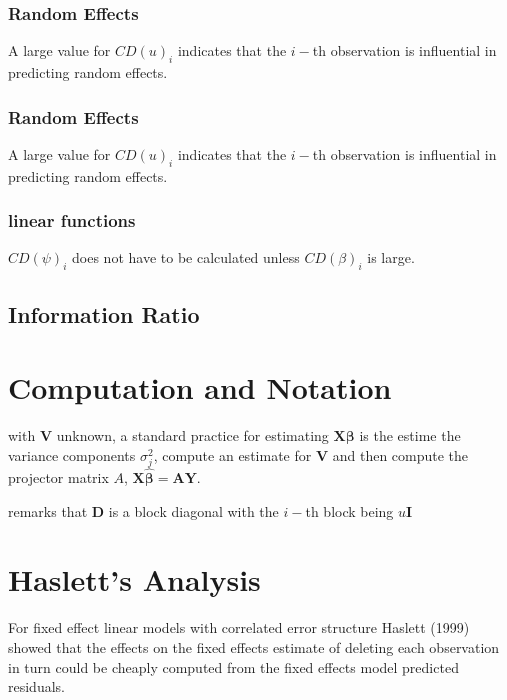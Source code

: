 \documentclass[12pt, a4paper]{article}
\begin{document}
\newpage
\subsubsection{Random Effects}


A large value for $CD(u)_i$ indicates that the $i-$th observation is influential in predicting random effects.


\subsubsection{Random Effects}


A large value for $CD(u)_i$ indicates that the $i-$th observation is influential in predicting random effects.


\subsubsection{linear functions}


$CD(\psi)_i$ does not have to be calculated unless $CD(\beta)_i$ is large.




\subsection{Information Ratio}




\newpage

\section{Computation and Notation } %
with $\boldsymbol{V}$ unknown, a standard practice for estimating $\boldsymbol{X \beta}$ is the estime the variance components $\sigma^2_j$,
compute an estimate for $\boldsymbol{V}$ and then compute the projector matrix $A$, $\boldsymbol{X \hat{\beta}}  = \boldsymbol{AY}$.


\citet{zewotir} remarks that $\boldsymbol{D}$ is a block diagonal with the $i-$th block being $u \boldsymbol{I}$




\section{Haslett's Analysis} %
For fixed effect linear models with correlated error structure Haslett (1999) showed that the effects on
the fixed effects estimate of deleting each observation in turn could be cheaply computed from the fixed effects model predicted residuals.
\end{document}
